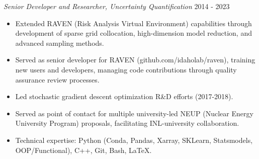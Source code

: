 \documentclass{res}
\begin{document}
\begin{resume}

{\sl Senior Developer and Researcher, Uncertainty Quantification} \hfill 2014 - 2023
\begin{itemize} \itemsep -2pt
  \item Extended RAVEN (Risk Analysis Virtual Environment) capabilities through development of sparse
      grid collocation, high-dimension model reduction, and advanced sampling methods.
  \item Served as senior developer for RAVEN (github.com/idaholab/raven), training new users and
      developers, managing code contributions through quality assurance review processes.
  \item Led stochastic gradient descent optimization R\&D efforts (2017-2018).
  \item Served as point of contact for multiple university-led NEUP (Nuclear Energy University
      Program) proposals, facilitating INL-university collaboration.
  \item Technical expertise: Python (Conda, Pandas, Xarray, SKLearn, Statsmodels, OOP/Functional),
      C++, Git, Bash, LaTeX.
\end{itemize} \vspace{-6pt}


\end{resume}
\end{document}
